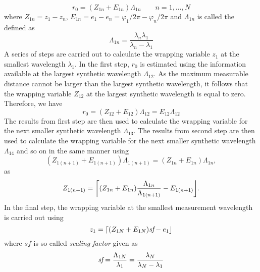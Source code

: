 \[
r_0 = (Z_{1n} + E_{1n})\Lambda_{1n} \qquad n=1,\ldots, N
\]
where $Z_{1n} = z_1 - z_n$, $E_{1n}= e_1 - e_n = \varphi_{1}/2\pi - \varphi_{n}/2\pi$ and $\Lambda_{1n}$ is called the  defined as
\[
\Lambda_{1n} = \dfrac{\lambda_n\lambda_1}{\lambda_n - \lambda_1}
\]
A series of steps are carried out to calculate the wrapping variable $z_1$ at the smallest wavelength $\lambda_1$. In the first step, $r_0$ is estimated using the information available at the largest synthetic wavelength $\Lambda_{12}$. As the maximum measurable distance cannot be larger than the largest synthetic wavelength, it follows that the wrapping variable $Z_{12}$ at the largest synthetic wavelength is equal to zero. Therefore, we have~\cite{Falaggis-generalized-th-of-PU-2012}
\[
r_0 = (Z_{12} + E_{12}) \Lambda_{12} = E_{12} \Lambda_{12}
\]
The results from first step are then used to calculate the wrapping variable for the next smaller synthetic wavelength $\Lambda_{13}$.
The results from second step are then used to calculate the wrapping variable for the next smaller synthetic wavelength $\Lambda_{14}$ and so on in the same manner using
\[
(Z_{1(n+1)} + E_{1(n+1)})\Lambda_{1(n+1)} = (Z_{1n} + E_{1n})\Lambda_{1n},
\]
as
\[
Z_{1(n+1)} = {\left\lceil  (Z_{1n} + E_{1n}) \dfrac{\Lambda_{1n}}{\Lambda_{1(n+1)}} -  E_{1(n+1)} \right\rfloor}.
\]
In the final step, the wrapping variable at the smallest measurement wavelength is carried out using
\[
z_1 = {\left\lceil (Z_{1N} + E_{1N})\emph{sf}  - e_1  \right\rfloor}
\]
where $sf$ is so called \emph{scaling factor} given as
\[
\emph{sf} = \dfrac{\Lambda_{1N}}{\lambda_1} = \dfrac{\lambda_{N}}{\lambda_{N} - \lambda_1}
\]

